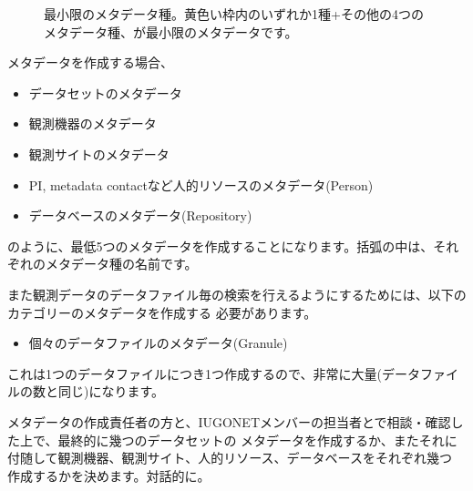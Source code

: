 \begin{figure}[H]
\begin{center}
\caption{最小限のメタデータ種。黄色い枠内のいずれか1種+その他の4つのメタデータ種、が最小限のメタデータです。}
\label{spaseOntology2}
\end{center}
\end{figure}

メタデータを作成する場合、
\begin{itemize}
\item データセットのメタデータ
\item 観測機器のメタデータ
\item 観測サイトのメタデータ
\item PI, metadata contactなど人的リソースのメタデータ(Person)
\item データベースのメタデータ(Repository)
\end{itemize}
のように、最低5つのメタデータを作成することになります。括弧の中は、それぞれのメタデータ種の名前です。\par
 また観測データのデータファイル毎の検索を行えるようにするためには、以下のカテゴリーのメタデータを作成する
必要があります。\par
\begin{itemize}
\item 個々のデータファイルのメタデータ(Granule)
\end{itemize}
これは1つのデータファイルにつき1つ作成するので、非常に大量(データファイルの数と同じ)になります。\par
 メタデータの作成責任者の方と、IUGONETメンバーの担当者とで相談・確認した上で、最終的に幾つのデータセットの
メタデータを作成するか、またそれに付随して観測機器、観測サイト、人的リソース、データベースをそれぞれ幾つ
作成するかを決めます。対話的に。

